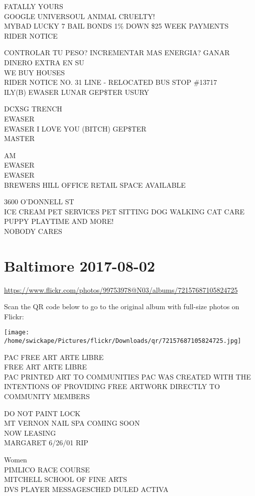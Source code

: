 \documentclass[10pt,letterpaper]{article}
\begin{document}
FATALLY YOURS\\
GOOGLE UNIVERSOUL ANIMAL CRUELTY!\\
MYBAD LUCKY 7 BAIL BONDS 1\% DOWN \$25 WEEK PAYMENTS\\
RIDER NOTICE

CONTROLAR TU PESO? INCREMENTAR MAS ENERGIA? GANAR DINERO EXTRA EN SU\\
WE BUY HOUSES\\
RIDER NOTICE NO. 31 LINE {-} RELOCATED BUS STOP \#13717\\
ILY(B) EWASER LUNAR GEP\$TER USURY

DCXSG TRENCH\\
EWASER\\
EWASER I LOVE YOU (BITCH) GEP\$TER\\
MASTER

AM\\
EWASER\\
EWASER\\
BREWERS HILL OFFICE RETAIL SPACE AVAILABLE

3600 O'DONNELL ST\\
ICE CREAM PET SERVICES PET SITTING DOG WALKING CAT CARE PUPPY PLAYTIME AND MORE!\\
NOBODY CARES
\pagebreak

\section*{Baltimore 2017-08-02}

\url{https://www.flickr.com/photos/99753978@N03/albums/72157687105824725}

Scan the QR code below to go to the original album with full-size photos on Flickr:

\texttt{[image: /home/swickape/Pictures/flickr/Downloads/qr/72157687105824725.jpg]}
\pagebreak

PAC FREE ART ARTE LIBRE\\
FREE ART ARTE LIBRE\\
PAC PRINTED ART TO COMMUNITIES PAC WAS CREATED WITH THE INTENTIONS OF PROVIDING FREE ARTWORK DIRECTLY TO COMMUNITY MEMBERS

DO NOT PAINT LOCK\\
MT VERNON NAIL SPA COMING SOON\\
NOW LEASING\\
MARGARET 6/26/01 RIP

Women\\
PIMLICO RACE COURSE\\
MITCHELL SCHOOL OF FINE ARTS\\
DVS PLAYER MESSAGESCHED DULED ACTIVA
\end{document}
